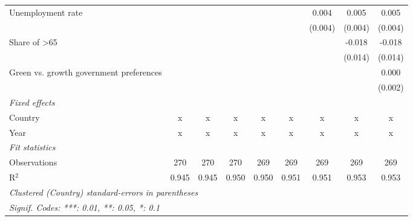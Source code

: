 \begin{table}[htbp]
\begin{tabular}{lcccccccc}
      Unemployment rate                       &         &             &             &             &             & 0.004       & 0.005       & 0.005\\   
                                              &         &             &             &             &             & (0.004)     & (0.004)     & (0.004)\\   
      Share of >65                            &         &             &             &             &             &             & -0.018      & -0.018\\   
                                              &         &             &             &             &             &             & (0.014)     & (0.014)\\   
      Green vs. growth government preferences &         &             &             &             &             &             &             & 0.000\\   
                                              &         &             &             &             &             &             &             & (0.002)\\   
      \emph{Fixed effects}\\
      Country                                 & x       & x           & x           & x           & x           & x           & x           & x\\  
      Year                                    & x       & x           & x           & x           & x           & x           & x           & x\\  
      \midrule \emph{Fit statistics}\\
      Observations                            & 270     & 270         & 270         & 269         & 269         & 269         & 269         & 269\\  
      R$^2$                                   & 0.945   & 0.945       & 0.950       & 0.950       & 0.951       & 0.951       & 0.953       & 0.953\\  
      \midrule
      \multicolumn{9}{l}{\emph{Clustered (Country) standard-errors in parentheses}}\\
      \multicolumn{9}{l}{\emph{Signif. Codes: ***: 0.01, **: 0.05, *: 0.1}}\\
   \end{tabular}
\end{table}


